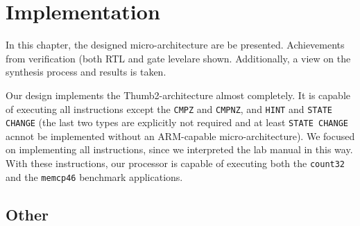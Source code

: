 \chapter{Implementation}
\label{cha:implementation}

In this chapter, the designed micro-architecture are be presented. Achievements from verification (both RTL and gate levelare shown. Additionally, a view on the synthesis process and results is taken.

Our design implements the Thumb2-architecture almost completely. It is capable of executing all instructions except the \texttt{CMPZ} and \texttt{CMPNZ}, and \texttt{HINT} and \texttt{STATE CHANGE} (the last two types are explicitly not required and at least \texttt{STATE CHANGE} acnnot be implemented without an ARM-capable micro-architecture). We focused on implementing all instructions, since we interpreted the lab manual in this way. With these instructions, our processor is capable of executing both the \texttt{count32} and the \texttt{memcp46} benchmark applications.






\section{Other}
\label{sec:other}